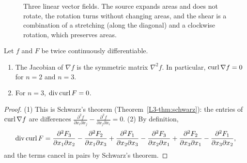 \begin{figure}[ht]
    \centering
    \newcommand{\fieldpanel}[4]{%
        \begin{scope}[shift={(#1,0)}]
            \draw[gray!60] (-1.3,0) -- (1.3,0) (0,-1.3) -- (0,1.3);
            \foreach \x in {-1,-0.5,...,1}
                \foreach \y in {-1,-0.5,...,1} {
                    \pgfmathsetmacro{\u}{0.3*(#2)}
                    \pgfmathsetmacro{\v}{0.3*(#3)}
                    \pgfmathsetmacro{\len}{abs(\u) + abs(\v)}
                    \ifdim \len pt > 0.001pt
                        \draw[->, thick, blue!70!black] (\x,\y) -- ++(\u,\v);
                    \else
                        \fill[blue!70!black] (\x,\y) circle (0.9pt);
                    \fi
                }
            \node[below, align=center, font=\small] at (0,-1.4) {#4};
        \end{scope}}
    \caption{Three linear vector fields. The source expands areas and does not rotate, the rotation turns without changing areas, and the shear is a combination of a stretching (along the diagonal) and a clockwise rotation, which preserves areas.}
    \label{L3-fig:vector-fields}
\end{figure}

\begin{proposition}\label{L3-prop:curl-grad}
    Let $f$ and $F$ be twice continuously differentiable.
    \begin{enumerate}
        \item The Jacobian of $\nabla f$ is the symmetric matrix $\nabla^2 f$. In particular, $\operatorname{curl}\nabla f = 0$ for $n = 2$ and $n = 3$.
        \item For $n = 3$, $\operatorname{div}\operatorname{curl} F = 0$.
    \end{enumerate}
\end{proposition}

\begin{proof}
    (1) This is Schwarz's theorem (Theorem~\ref{L3-thm:schwarz}): the entries of $\operatorname{curl}\nabla f$ are differences $\frac{\partial^2 f}{\partial x_i\partial x_j} - \frac{\partial^2 f}{\partial x_j\partial x_i} = 0$. (2) By definition,
    \[\operatorname{div}\operatorname{curl} F = \frac{\partial^2 F_3}{\partial x_1\partial x_2} - \frac{\partial^2 F_2}{\partial x_1\partial x_3} + \frac{\partial^2 F_1}{\partial x_2\partial x_3} - \frac{\partial^2 F_3}{\partial x_2\partial x_1} + \frac{\partial^2 F_2}{\partial x_3\partial x_1} - \frac{\partial^2 F_1}{\partial x_3\partial x_2},\]
    and the terms cancel in pairs by Schwarz's theorem.
\end{proof}

